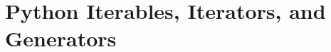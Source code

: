 

\appendix
\setcounter{section}{1}
\section{Python Iterables, Iterators, and Generators}



% 
% 
% 
% 
% 


% 
% 
% 
% 


% 
% 


% 
% 
